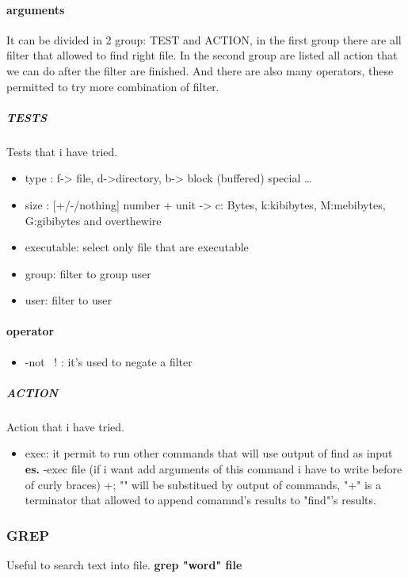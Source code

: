 \documentclass{article}
\begin{document}
                    \paragraph{arguments}
                    It can be divided in 2 group: TEST and ACTION, in the first group there are all filter that allowed to find right file. In the second group are listed all action that we can do after the filter are finished. 
                    And there are also many operators, these permitted to try more combination of filter.   
                    \subparagraph{TESTS}
                    Tests that i have tried.
                    \begin{itemize}
                        \item type : f-> file, d->directory, b-> block (buffered) special \dots
                        \item size : [+/-/nothing] number + unit -> c: Bytes, k:kibibytes, M:mebibytes, G:gibibytes and overthewire
                        \item executable: select only file that are executable   
                        \item group: filter to group user
                        \item user: filter to user
                    \end{itemize}
                    \paragraph{operator}
                    \begin{itemize}
                        \item -not \ ! : it's used to negate a filter
                    \end{itemize}
                    \subparagraph{ACTION}
                    Action that i have tried.
                    \begin{itemize}
                        \item exec: it permit to run other commands that will use output of find as input \textbf{es. } -exec file (if i want add arguments of this command i have to write before of curly braces){} +; "{}" will be substitued by output of commands, "+" is a terminator that allowed to append comamnd's results to "find"'s results. 
                    \end{itemize}
                \subsubsection{GREP}
                    Useful to search text into file.
                    \textbf{grep "word" file}
\end{document}
